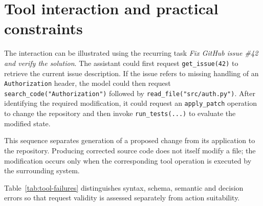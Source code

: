 \section{Tool interaction and practical constraints}
\label{sec:tool-constraints}

The interaction can be illustrated using the recurring task \emph{Fix GitHub issue \#42 and verify the solution}. The assistant could first request \texttt{get\_issue(42)} to retrieve the current issue description. If the issue refers to missing handling of an \texttt{Authorization} header, the model could then request \texttt{search\_code("Authorization")} followed by \texttt{read\_file("src/auth.py")}. After identifying the required modification, it could request an \texttt{apply\_patch} operation to change the repository and then invoke \texttt{run\_tests(...)} to evaluate the modified state.

This sequence separates generation of a proposed change from its application to the repository. Producing corrected source code does not itself modify a file; the modification occurs only when the corresponding tool operation is executed by the surrounding system.

Table~\ref{tab:tool-failures} distinguishes syntax, schema, semantic and decision errors so that request validity is assessed separately from action suitability.

